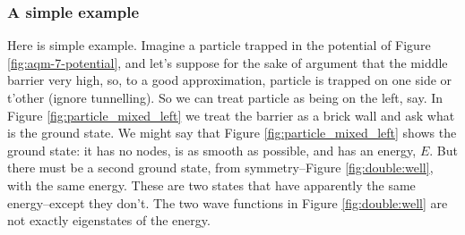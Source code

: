 \documentclass[]{article}
\begin{document}
\subsubsection{A simple example}

Here is simple example. Imagine a particle trapped in the potential of Figure \ref{fig:aqm-7-potential}, and let's suppose for the sake of argument that the middle barrier very high, so, to a good approximation, particle is trapped on one side or t'other (ignore tunnelling). So we can treat particle as being on the left, say. In Figure \ref{fig:particle_mixed_left} we treat the barrier as a brick wall and ask what is the ground state. We might say that Figure \ref{fig:particle_mixed_left} shows the ground state: it has no nodes, is as smooth as possible, and has an energy, $E$. But there must be a second ground state, from symmetry--Figure \ref{fig:double:well}, with the same energy. These are two states that have apparently the same energy--except they don't. The two wave functions in Figure  \ref{fig:double:well} are not exactly eigenstates of the energy.
\end{document}
